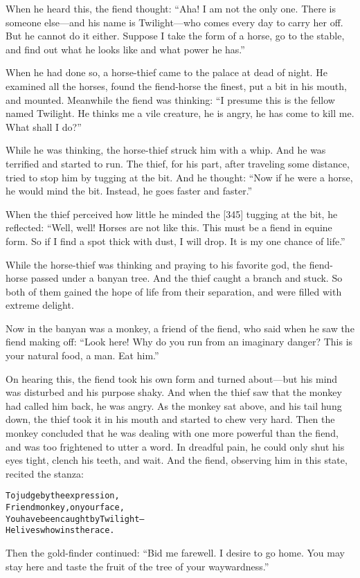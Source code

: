 \documentclass{article}
\renewenvironment{verbatim}{\begin{alltt}\normalfont\begin{centering}}{\end{centering}\end{alltt}}
\begin{document}
When he heard this, the fiend thought:
``Aha! I am not the only one. There is someone else---and his name is Twilight---who comes every day to carry her off. But he cannot do it either. Suppose I take the form of a horse, go to the stable, and find out what he looks like and what power he has.''

When he had done so, a horse-thief came to the palace at dead of
night. He examined all the horses, found the fiend-horse the
finest, put a bit in his mouth, and mounted. Meanwhile the fiend
was thinking:
``I presume this is the fellow named Twilight. He thinks me a vile creature, he is angry, he has come to kill me. What shall I do?''

While he was thinking, the horse-thief struck him with a whip. And
he was terrified and started to run. The thief, for his part, after
traveling some distance, tried to stop him by tugging at the bit.
And he thought:
``Now if he were a horse, he would mind the bit. Instead, he goes faster and faster.''

When the thief perceived how little he minded the [345] tugging at
the bit, he reflected:
``Well, well! Horses are not like this. This must be a fiend in equine form. So if I find a spot thick with dust, I will drop. It is my one chance of life.''

While the horse-thief was thinking and praying to his favorite god,
the fiend-horse passed under a banyan tree. And the thief caught a
branch and stuck. So both of them gained the hope of life from
their separation, and were filled with extreme delight.

Now in the banyan was a monkey, a friend of the fiend, who said
when he saw the fiend making off:
``Look here! Why do you run from an imaginary danger? This is your natural food, a man. Eat him.''

On hearing this, the fiend took his own form and turned about---but
his mind was disturbed and his purpose shaky. And when the thief
saw that the monkey had called him back, he was angry. As the
monkey sat above, and his tail hung down, the thief took it in his
mouth and started to chew very hard. Then the monkey concluded that
he was dealing with one more powerful than the fiend, and was too
frightened to utter a word. In dreadful pain, he could only shut
his eyes tight, clench his teeth, and wait. And the fiend,
observing him in this state, recited the stanza:

\begin{verbatim}
To judge by the expression,
    Friend monkey, on your face,
You have been caught by Twilight--
    He lives who wins the race.                         
\end{verbatim}
Then the gold-finder continued:
``Bid me farewell. I desire to go home. You may stay here and taste the fruit of the tree of your waywardness.''
\end{document}
